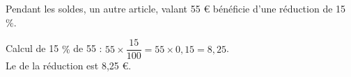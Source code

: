 \begin{myex}
	Pendant les soldes, un autre article, valant 55 € bénéficie d'une réduction de 15 $\%$.
	
	Calcul de 15 $\%$ de 55 : $55 \times \dfrac{15}{100} = 55 \times 0,15 = 8,25$.\\
	
	Le  de la réduction est 8,25 €.
\end{myex}